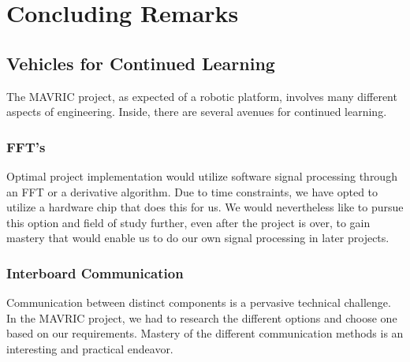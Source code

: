 \documentclass{article}
\begin{document}
\section{Concluding Remarks} %
    \label{sec:concluding_remarks}
    
    
        \subsection{Vehicles for Continued Learning}
        
            The MAVRIC project, as expected of a robotic platform, 
            involves many different aspects of engineering.
            Inside, there are several avenues for continued learning.
            
                \subsubsection{FFT's}
                
                    Optimal project implementation would utilize software signal
                    processing through an FFT or a derivative algorithm.
                    Due to time constraints,
                    we have opted to utilize a hardware chip that does this for us.
                    We would nevertheless like to pursue this option and field of study further,
                    even after the project is over,
                    to gain mastery that would enable us to do our own signal processing
                    in later projects.
                
                \subsubsection{Interboard Communication}

                    Communication between distinct components is a pervasive technical challenge.
                    In the MAVRIC project, we had to research the different options
                    and choose one based on our requirements.
                    Mastery of the different communication methods
                    is an interesting and practical endeavor. 
        
\end{document}
